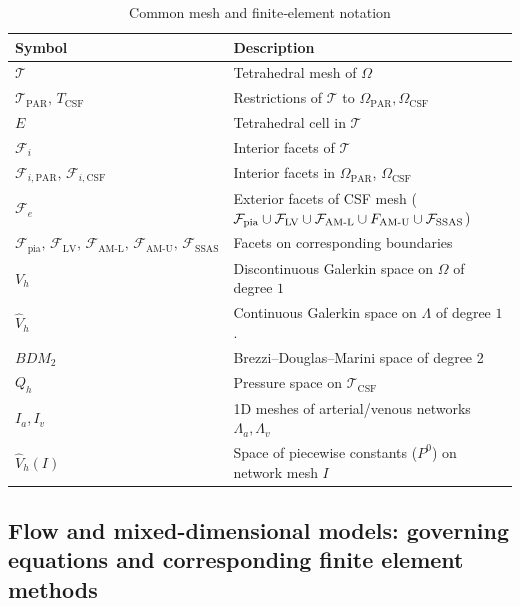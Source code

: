 \documentclass[fleqn,10pt]{wlscirep}
\begin{document}
\begin{table}[h!]
\centering
\caption{Common mesh and finite‐element notation}
\label{table:mesh}
\begin{tabular}{ll}
\hline
\textbf{Symbol} & \textbf{Description} \\
\hline
$\mathcal T$ & Tetrahedral mesh of $\Omega$ \\
$\mathcal{T}_{\mathrm{PAR}},\,T_{\mathrm{CSF}}$ & Restrictions of $\mathcal T$ to $\Omega_{\mathrm{PAR}},\Omega_{\mathrm{CSF}}$ \\
$E$ & Tetrahedral cell in $\mathcal T$ \\
$\mathcal F_{i}$ & Interior facets of $\mathcal T$ \\
$\mathcal F_{i,\mathrm{PAR}},\, \mathcal F_{i,\mathrm{CSF}}$ & Interior facets in $\Omega_{\mathrm{PAR}}$, $\Omega_{\mathrm{CSF}}$ \\
$\mathcal F_{e}$ & Exterior facets of CSF mesh ($\mathcal F_{\mathrm{pia}}\cup \mathcal F_{\mathrm{LV}}\cup \mathcal F_{\mathrm{AM\text{-}L}}\cup \mathcal \mathcal F_{\mathrm{AM\text{-}U}}\cup \mathcal F_{\mathrm{SSAS}}$) \\
$\mathcal F _{\mathrm{pia}},\,\mathcal F_{\mathrm{LV}},\, \mathcal F_{\mathrm{AM\text{-}L}},\,\mathcal F_{\mathrm{AM\text{-}U}},\, \mathcal F_{\mathrm{SSAS}}$ & Facets on corresponding boundaries \\
$V_{h}$ & Discontinuous Galerkin space on $\Omega$ of degree $1$\\
$\widehat V_{h}$ & Continuous Galerkin space on $\Lambda$ of degree $1$.  \\
$\mathit{BDM}_{2}$ & Brezzi–Douglas–Marini space of degree 2 \\
$Q_{h}$ & Pressure space on $\mathcal T_{\mathrm{CSF}}$  \\
$I_{a},I_{v}$ & 1D meshes of arterial/venous networks $\Lambda_{a},\Lambda_{v}$ \\
$\widehat V_{h}(I)$ & Space of piecewise constants ($P^0$) on network mesh $I$ \\
\hline
\end{tabular}
\end{table}

\subsection{Flow and mixed-dimensional models: governing equations and corresponding finite element methods }
\label{sec:app:more_maths}
\end{document}
